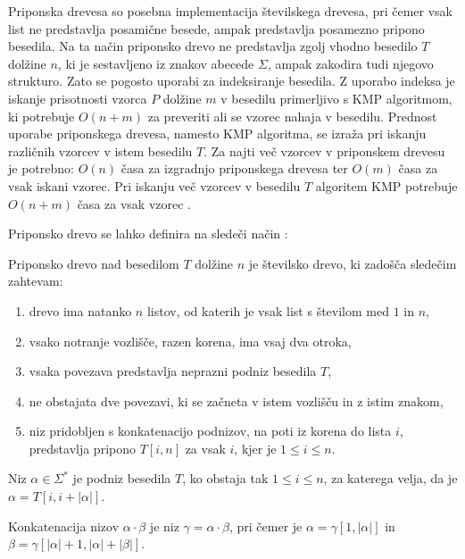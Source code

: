 Priponska drevesa so posebna implementacija številskega drevesa, pri čemer vsak list ne predstavlja posamične besede, ampak predstavlja posamezno pripono besedila. Na ta način priponsko drevo ne predstavlja zgolj vhodno besedilo $T$ dolžine $n$, ki je sestavljeno iz znakov abecede $\Sigma$, ampak zakodira tudi njegovo strukturo. Zato se pogosto uporabi za indeksiranje besedila. Z uporabo indeksa je iskanje prisotnosti vzorca $P$ dolžine $m$ v besedilu primerljivo s KMP algoritmom, ki potrebuje $O(n+m)$ za preveriti ali se vzorec nahaja v besedilu. Prednost uporabe priponskega drevesa, namesto KMP algoritma, se izraža pri iskanju različnih vzorcev v istem besedilu $T$. Za najti več vzorcev v priponskem drevesu je potrebno: $O(n)$ časa za izgradnjo priponskega drevesa ter $O(m)$ časa za vsak iskani vzorec. Pri iskanju več vzorcev v besedilu $T$ algoritem KMP potrebuje $O(n+m)$ časa za vsak vzorec \cite{Gusfield1997,KMP}.

Priponsko drevo se lahko definira na sledeči način \cite{Gusfield1997}:

\begin{defi}\label{def:priposkoDrevo}
    Priponsko drevo nad besedilom $T$ dolžine $n$ je številsko drevo, ki zadošča sledečim zahtevam:
    \begin{enumerate}
        \item drevo ima natanko $n$ listov, od katerih je vsak list s številom med $1$ in $n$,
        \item vsako notranje vozlišče, razen korena, ima vsaj dva otroka,
        \item vsaka povezava predstavlja neprazni podniz besedila $T$,
        \item ne obstajata dve povezavi, ki se začneta v istem vozlišču in z istim znakom,
        \item niz pridobljen s konkatenacijo podnizov, na poti iz korena do lista $i$, predstavlja pripono $T[i,n]$ za vsak $i$, kjer je $1 \le i\le n$.        
    \end{enumerate}
\end{defi}

\begin{defi}
    Niz $\alpha\in\Sigma^*$ je podniz besedila $T$, ko obstaja tak $1\le i\le n$, za katerega velja, da je  $\alpha=T[i,i+|\alpha|]$. 
\end{defi}

\begin{defi}
    Konkatenacija nizov $\alpha\cdot\beta$ je niz $\gamma=\alpha\cdot\beta$, pri čemer je $\alpha=\gamma[1,|\alpha|]$ in $\beta=\gamma[|\alpha|+1,|\alpha|+|\beta|]$.
\end{defi}

